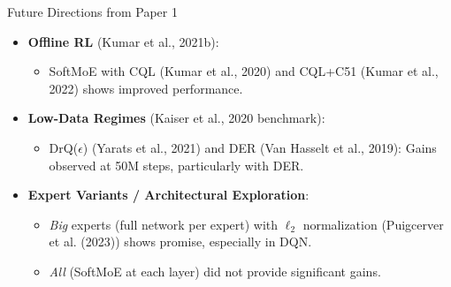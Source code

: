 \documentclass{beamer}
\newcommand{\puigcerverSoftMoE}{Puigcerver et al. (2023)}
\begin{document}
\begin{frame}{Future Directions from Paper 1}
  \begin{itemize}
    \item \textbf{Offline RL} (Kumar et al., 2021b):
        \begin{itemize}
            \item SoftMoE with CQL (Kumar et al., 2020) and CQL+C51 (Kumar et al., 2022) shows improved performance.
        \end{itemize}
    \item \textbf{Low-Data Regimes} (Kaiser et al., 2020 benchmark):
        \begin{itemize}
            \item DrQ($\epsilon$) (Yarats et al., 2021) and DER (Van Hasselt et al., 2019): Gains observed at 50M steps, particularly with DER.
        \end{itemize}
    \item \textbf{Expert Variants / Architectural Exploration}:
        \begin{itemize}
            \item \textit{Big} experts (full network per expert) with $\ell_2$ normalization (\puigcerverSoftMoE{}) shows promise, especially in DQN.
            \item \textit{All} (SoftMoE at each layer) did not provide significant gains.
        \end{itemize}
  \end{itemize}
\end{frame}

\end{document}
